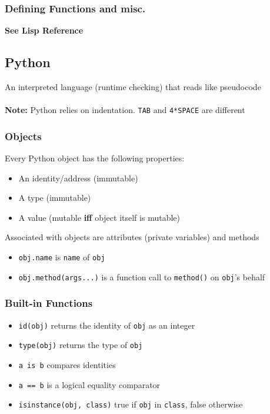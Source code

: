 \documentclass[13pt]{article}
\begin{document}
      \subsubsection{Defining Functions and misc.}
      \textbf{See Lisp Reference}

      \subsection{Python}
      An interpreted language (runtime checking) that reads like pseudocode \\ \\
      \textbf{Note:} Python relies on indentation. \texttt{TAB} and \texttt{4*SPACE} are different

      \subsubsection{Objects}
      Every Python object has the following properties:
      \begin{itemize}[leftmargin = 0pt]
      \item [] An identity/address (immutable)
      \item [] A type (immutable)
      \item [] A value (mutable \textbf{iff} object itself is mutable)
      \end{itemize}
      Associated with objects are attributes (private variables) and methods
      \begin{itemize}[leftmargin = 0pt]
      \item [] \texttt{obj.name} is \texttt{name} of \texttt{obj}
      \item [] \texttt{obj.method(args...)} is a function call to \texttt{method()} on \texttt{obj}'s behalf
      \end{itemize}

      \subsubsection{Built-in Functions}
      \begin{itemize}[leftmargin = 0pt]
      \item [] \texttt{id(obj)} returns the identity of \texttt{obj} as an integer
      \item [] \texttt{type(obj)} returns the type of \texttt{obj}
      \item [] \texttt{a is b} compares identities
      \item [] \texttt{a == b} is a logical equality comparator
      \item [] \texttt{isinstance(obj, class)} true if \texttt{obj} in \texttt{class}, false otherwise
      \end{itemize}
\end{document}
